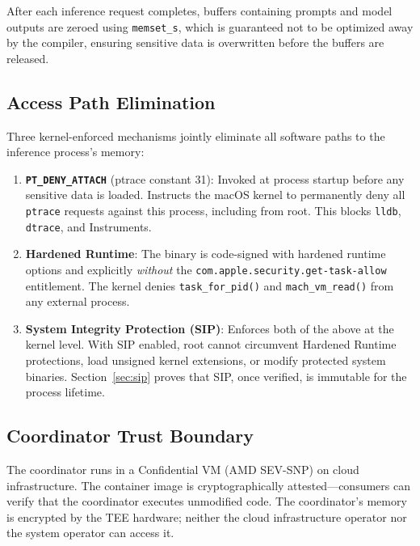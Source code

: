 \documentclass[10pt,twocolumn,letterpaper]{article}
\begin{document}
After each inference request completes, buffers containing prompts and model outputs are zeroed using \texttt{memset\_s}, which is guaranteed not to be optimized away by the compiler, ensuring sensitive data is overwritten before the buffers are released.

\subsection{Access Path Elimination}
\label{sec:access-path}

Three kernel-enforced mechanisms jointly eliminate all software paths to the inference process's memory:

\begin{enumerate}[leftmargin=*,itemsep=2pt,topsep=2pt]
    \item \textbf{\texttt{PT\_DENY\_ATTACH}} (ptrace constant 31): Invoked at process startup before any sensitive data is loaded. Instructs the macOS kernel to permanently deny all \texttt{ptrace} requests against this process, including from root. This blocks \texttt{lldb}, \texttt{dtrace}, and Instruments.

    \item \textbf{Hardened Runtime}: The binary is code-signed with hardened runtime options and explicitly \emph{without} the \texttt{com.apple.security.get-task-allow} entitlement. The kernel denies \texttt{task\_for\_pid()} and \texttt{mach\_vm\_read()} from any external process.

    \item \textbf{System Integrity Protection (SIP)}: Enforces both of the above at the kernel level. With SIP enabled, root cannot circumvent Hardened Runtime protections, load unsigned kernel extensions, or modify protected system binaries. Section~\ref{sec:sip} proves that SIP, once verified, is immutable for the process lifetime.
\end{enumerate}

\subsection{Coordinator Trust Boundary}

The coordinator runs in a Confidential VM (AMD SEV-SNP) on cloud infrastructure. The container image is cryptographically attested---consumers can verify that the coordinator executes unmodified code. The coordinator's memory is encrypted by the TEE hardware; neither the cloud infrastructure operator nor the system operator can access it.
\end{document}
